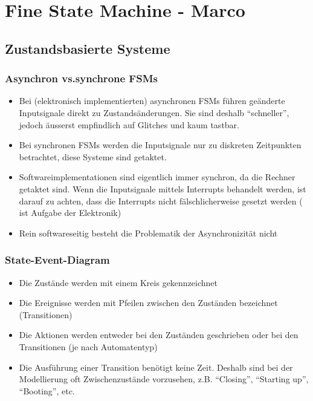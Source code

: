 \section{Fine State Machine - Marco}

\subsection{Zustandsbasierte Systeme}

\subsubsection{Asynchron vs.synchrone FSMs }
\begin{itemize}
  \item Bei (elektronisch implementierten) asynchronen FSMs führen geänderte
  Inputsignale direkt zu Zustandsänderungen. Sie sind deshalb "`schneller"',
  jedoch äusserst empfindlich auf Glitches und kaum tastbar.
  \item Bei synchronen FSMs werden die Inputsignale nur zu diskreten Zeitpunkten
  betrachtet, diese Systeme sind getaktet.
  \item Softwareimplementationen sind eigentlich immer synchron, da die Rechner
  getaktet sind. Wenn die Inputsignale mittels Interrupts behandelt werden, ist
  darauf zu achten, dass die Interrupts nicht fälschlicherweise gesetzt werden (
  ist Aufgabe der Elektronik)
  \item Rein softwareseitig besteht die Problematik der Asynchronizität nicht
\end{itemize}

\subsubsection{State-Event-Diagram }
\begin{itemize}
  \item Die Zustände werden mit einem Kreis gekennzeichnet
  \item Die Ereignisse werden mit Pfeilen zwischen den Zuständen bezeichnet
  (Transitionen)
  \item Die Aktionen werden entweder bei den Zuständen geschrieben oder bei den
  Transitionen (je nach Automatentyp)
  \item Die Ausführung einer Transition benötigt keine Zeit. Deshalb sind bei
  der Modellierung oft Zwischenzustände vorzusehen, z.B. "`Closing"', "`Starting
  up"', "`Booting"', etc.
\end{itemize}

